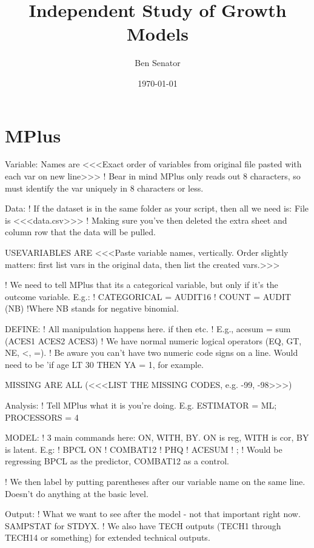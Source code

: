 \documentclass{article}
\title{Independent Study of Growth Models}
\author{Ben Senator}
\date{\today}
\begin{document}
\maketitle

\tableofcontents

\newpage

\section{MPlus}

Variable:
Names are
<<<Exact order of variables from original file pasted with each var on new line>>>
! Bear in mind MPlus only reads out 8 characters, so must identify the var uniquely in 8 characters or less.

Data:
! If the dataset is in the same folder as your script, then all we need is:
File is <<<data.csv>>>
! Making sure you've then deleted the extra sheet and column row that the data will be pulled.

USEVARIABLES ARE
<<<Paste variable names, vertically. Order slightly matters: first list vars in the original data, then list the created vars.>>>

! We need to tell MPlus that its a categorical variable, but only if it's the outcome variable. E.g.:
! CATEGORICAL = AUDIT16
! COUNT = AUDIT (NB) !Where NB stands for negative binomial.

DEFINE:
! All manipulation happens here. if then etc.
! E.g., acesum = sum (ACES1
ACES2
ACES3)
! We have normal numeric logical operators (EQ, GT, NE, <, =).
! Be aware you can't have two numeric code signs on a line. Would need to be 'if age LT 30 THEN YA = 1, for example. 

MISSING ARE ALL (<<<LIST THE MISSING CODES, e.g. -99, -98>>>)

Analysis:
! Tell MPlus what it is you're doing. E.g. ESTIMATOR = ML; PROCESSORS = 4

MODEL:
! 3 main commands here: ON, WITH, BY. ON is reg, WITH is cor, BY is latent. E.g:
! BPCL ON
! COMBAT12
! PHQ
! ACESUM
! ;
! Would be regressing BPCL as the predictor, COMBAT12 as a control.

! We then label by putting parentheses after our variable name on the same line. Doesn't do anything at the basic level.

Output:
! What we want to see after the model - not that important right now. SAMPSTAT for STDYX.
! We also have TECH outputs (TECH1 through TECH14 or something) for extended technical outputs.
\end{document}
